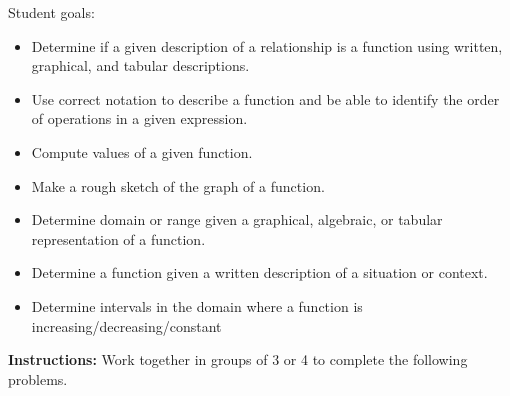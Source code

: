 


\noindent
Student goals:
  \begin{itemize}
  \item Determine if a given description of a relationship is a
    function using written, graphical, and tabular descriptions.
  \item Use correct notation to describe a function and be able to
    identify the order of operations in a given expression.
  \item Compute values of a given function.
  \item Make a rough sketch of the graph of a function.
  \item Determine domain or range given a graphical, algebraic, or
    tabular representation of a function.
  \item Determine a function given a written description of a
    situation or context.
  \item Determine intervals in the domain where a function is
    increasing/decreasing/constant
  \end{itemize}


\noindent \textbf{Instructions:}  Work together in groups of  3 or 4 to complete the following problems.


